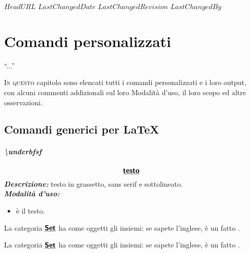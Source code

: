 \svnidlong
{$HeadURL$}
{$LastChangedDate$}
{$LastChangedRevision$}
{$LastChangedBy$}

\chapter{Comandi personalizzati}
\begin{introduction}
	``...''
	\begin{flushright}
	\end{flushright}
\end{introduction}
\lettrine[findent=1pt, nindent=0pt]{I}{n questo} capitolo sono elencati tutti i comandi personalizzati e i loro output, con alcuni commenti addizionali sul loro Modalità d'uso, il loro scopo ed altre osservazioni.
\section{Comandi generici per \LaTeX}
\paragraph{\textbackslash underbfsf}
\begin{equation*}
	\textbf{\textsf{\underline{testo}}}
\end{equation*}
\textbf{\textit{Descrizione:}} testo in grassetto, sans serif e sottolineato.\\
\textbf{\textit{Modalità d'uso:}}
\begin{itemize}
	\item {} è il testo.
\end{itemize}
\begin{codelatex}
\end{codelatex}
\begin{example}{}
	La categoria $\textbf{\textsf{\underline{Set}}}$ ha come oggetti gli insiemi: se sapete l'inglese, è un fatto .
\end{example}
\begin{codelatex}
La categoria $\textbf{\textsf{\underline{Set}}}$ ha come oggetti gli insiemi: se sapete l'inglese, è un fatto .
\end{codelatex}
